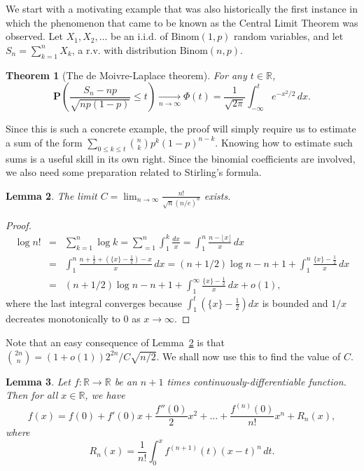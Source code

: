\documentclass[12pt]{article}
\newtheorem{thm}{Theorem}[section]
\newtheorem{lem}[thm]{Lemma}
\newcommand{\R}{\mathbb{R}}
\newcommand{\prob}{\mathbf{P}}
\theoremstyle{example}
\begin{document}
We start with a motivating example that was also historically the first instance in which the phenomenon that came to be known as the Central Limit Theorem was observed. Let $X_1, X_2, \ldots$ be an i.i.d. of $\textrm{Binom}(1,p)$ random variables, and let $S_n = \sum_{k=1}^n X_k$, a r.v. with distribution $\textrm{Binom}(n,p)$.

\begin{thm}[The de Moivre-Laplace theorem] For any $t\in \R$,
$$ \prob
\left(\frac{S_n - n p}{\sqrt{n p(1-p)}} \le t \right) \xrightarrow[n\to\infty]{} \Phi(t) = \frac{1}{\sqrt{2\pi}}
\int_{-\infty}^t e^{-x^2/2}\,dx. 
$$
\label{thm-demoivre-laplace}
\end{thm}

Since this is such a concrete example, the proof will simply require us to estimate a sum of the form $\sum_{0\le k\le t} \binom{n}{k} p^k (1-p)^{n-k}$. Knowing how to estimate such sums is a useful skill in its own right. Since the binomial coefficients are involved, we also need some preparation related to Stirling's formula.

\begin{lem}
The limit $C = \lim_{n\to\infty} \frac{n!}{\sqrt{n} (n/e)^n}$ exists.
\label{lem-prestirling}
\end{lem}

\begin{proof} 
\begin{eqnarray*}
\log n! &=& \sum_{k=1}^n \log k = \sum_{=1}^n \int_1^k \frac{dx}{x} = \int_1^n \frac{n-\lfloor x\rfloor}{x}\,dx
\\ &=& \int_1^n \frac{n+\frac12 + (\{ x\}-\frac12)-x}{x}\, dx = (n+1/2)\log n - n + 1 + \int_1^n \frac{\{x\}-\frac12}{x}\,dx 
\\ &=& (n+1/2)\log n - n + 1 + \int_1^\infty \frac{\{x\}-\frac12}{x}\,dx + o(1),
\end{eqnarray*}
where the last integral converges because $\int_1^t (\{x\}-\frac12) dx$ is bounded and $1/x$ decreates monotonically to 0 as $x\to\infty$.
\end{proof}

Note that an easy consequence of Lemma~\ref{lem-prestirling} is that $\binom{2n}{n} = (1+o(1))2^{2n}/C\sqrt{n/2}$. We shall now use this to find the value of $C$.

\begin{lem} Let $f:\R\to\R$ be an $n+1$ times continuously-differentiable function. Then for all $x\in\R$, we have
$$f(x) = f(0) + f'(0)x + \frac{f''(0)}{2}x^2 + \ldots + \frac{f^{(n)}(0)}{n!} x^n + R_n(x), $$
where
$$ R_n(x) = \frac{1}{n!} \int_0^x f^{(n+1)}(t)(x-t)^n\,dt.
$$
\label{lem-prevlemma}
\end{lem}
\end{document}
